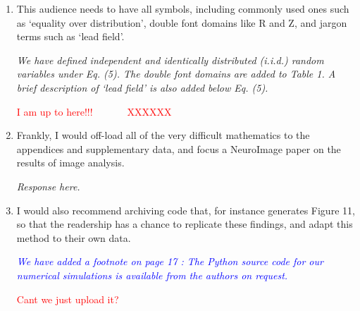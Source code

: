 \documentclass{article}
\newcommand{\dean}[1]{\textcolor{red}{#1}}
\newcommand{\parham}[1]{\textcolor{blue}{#1}}
\begin{document}
\begin{enumerate}
		\item This audience needs to have all symbols, including commonly used ones such as `equality over distribution', double font domains like R and Z, and jargon terms such as `lead field'.
			
		\emph{We have defined independent and identically distributed (i.i.d.) random variables under Eq. (5). The double font domains are added to Table 1. A brief description of `lead field' is also added below Eq. (5).}  
	
	\dean{I am up to here!!!~~~~~~~XXXXXX~~~~~~}		
		\item Frankly, I would off-load all of the very difficult mathematics to the appendices and supplementary data, and focus a NeuroImage paper on the results of image analysis. 
			
			\emph{Response here.}
			
						
			
			\item I would also recommend archiving code that, for instance generates Figure 11, so that the readership has a chance to replicate these findings, and adapt this method to their own data.
			
 			\emph{\parham{We have added a footnote on page 17 : The Python source code for our numerical simulations is available from the authors on request.}}
 		
\dean{Cant we just upload it?}
			                                       
			\end{enumerate}  
\end{document}
